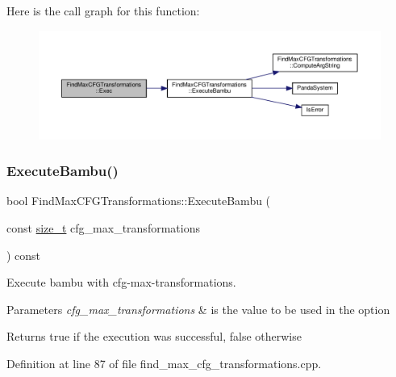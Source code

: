 Here is the call graph for this function\+:
\nopagebreak
\begin{figure}[H]
\begin{center}
\leavevmode
\includegraphics[width=350pt]{d7/d5e/classFindMaxCFGTransformations_a6ac50147095421ddfda88a6fbb33e969_cgraph}
\end{center}
\end{figure}
\mbox{\label{classFindMaxCFGTransformations_a57355680b93a3644f7c51a7a66bea078}} 
\subsubsection{\texorpdfstring{Execute\+Bambu()}{ExecuteBambu()}}
{\footnotesize\ttfamily bool Find\+Max\+C\+F\+G\+Transformations\+::\+Execute\+Bambu (\begin{DoxyParamCaption}\item[{const \hyperlink{tutorial__fpt__2017_2intro_2sixth_2test_8c_a7c94ea6f8948649f8d181ae55911eeaf}{size\+\_\+t}}]{cfg\+\_\+max\+\_\+transformations }\end{DoxyParamCaption}) const\hspace{0.3cm}{\ttfamily [private]}}



Execute bambu with cfg-\/max-\/transformations. 


\begin{DoxyParams}{Parameters}
{\em cfg\+\_\+max\+\_\+transformations} & is the value to be used in the option \\
\hline
\end{DoxyParams}
\begin{DoxyReturn}{Returns}
true if the execution was successful, false otherwise 
\end{DoxyReturn}


Definition at line 87 of file find\+\_\+max\+\_\+cfg\+\_\+transformations.\+cpp.




